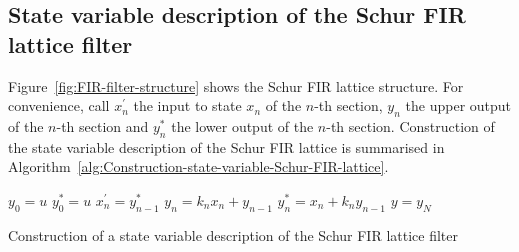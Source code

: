 \documentclass[a4paper,twoside,10pt,english]{report}
\begin{document}
\subsection{State variable description of the Schur FIR lattice filter}
Figure~\ref{fig:FIR-filter-structure} shows the Schur FIR lattice structure. 
For convenience, call $x_{n}^{\prime}$ the input to state $x_{n}$ of
the $n$-th section, $y_{n}$ the upper output of the $n$-th section
and $y_{n}^{*}$ the lower output of the $n$-th section. Construction of the
state variable description of the Schur FIR lattice is summarised in
Algorithm~\ref{alg:Construction-state-variable-Schur-FIR-lattice}.
\begin{algorithm}[!htbp]
\begin{algorithmic}
\State $y_{0} = u$
\State $y_{0}^{*} = u$
  \State $x_{n}^{\prime} = y_{n-1}^{*}$
  \State $y_{n} = k_{n}x_{n} + y_{n-1}$
  \State $y_{n}^{*} = x_{n}+k_{n}y_{n-1}$
\EndFor
\State $y = y_{N}$
\end{algorithmic}
\caption{Construction of a state variable description of the Schur FIR lattice filter}
\label{alg:Construction-state-variable-Schur-FIR-lattice}
\end{algorithm}
\end{document}
